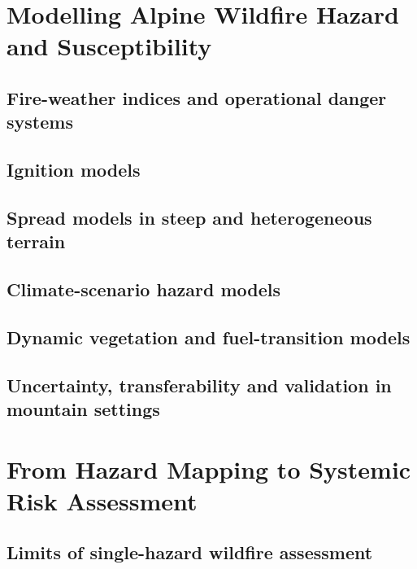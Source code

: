 \documentclass[11pt,a4paper]{article}
\begin{document}


\section{Modelling Alpine Wildfire Hazard and Susceptibility}

\subsection{Fire-weather indices and operational danger systems}

\subsection{Ignition models}

\subsection{Spread models in steep and heterogeneous terrain}

\subsection{Climate-scenario hazard models}

\subsection{Dynamic vegetation and fuel-transition models}

\subsection{Uncertainty, transferability and validation in mountain settings}


\section{From Hazard Mapping to Systemic Risk Assessment}

\subsection{Limits of single-hazard wildfire assessment}
\end{document}
